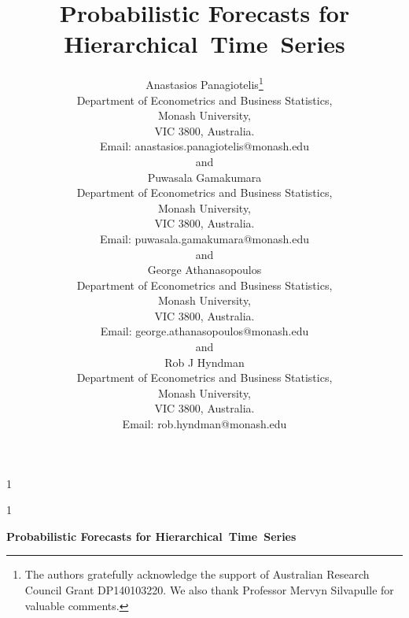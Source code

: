 \documentclass[11pt]{article}
\newcommand{\blind}{1}
\theoremstyle{definition}
\begin{document}
	\def\spacingset#1{\renewcommand{\baselinestretch}%
		{#1}\small\normalsize} \spacingset{1}


	\blind
	{
		\title{\textbf{Probabilistic Forecasts for Hierarchical~Time~Series}}
		        \author{
			    Anastasios Panagiotelis\thanks{
			    	The authors gratefully acknowledge the support of Australian Research Council Grant DP140103220. We also thank Professor Mervyn Silvapulle for valuable comments.}\hspace{.2cm}\\
			    Department of Econometrics and Business Statistics,\\
		    	Monash University,\\ VIC 3800, Australia.\\
			    Email: anastasios.panagiotelis@monash.edu \\
			    and \\
			    Puwasala Gamakumara\\
			    Department of Econometrics and Business Statistics,\\
			    Monash University,\\ VIC 3800, Australia.\\
			    Email: puwasala.gamakumara@monash.edu \\
			    and \\
		        George Athanasopoulos\\
		        Department of Econometrics and Business Statistics,\\
		        Monash University,\\ VIC 3800, Australia.\\
		        Email: george.athanasopoulos@monash.edu \\
		        and \\
	            Rob J Hyndman\\
	            Department of Econometrics and Business Statistics,\\
	            Monash University,\\ VIC 3800, Australia.\\
	            Email: rob.hyndman@monash.edu \\}
		\maketitle
	} \fi

	\blind
	{
		\bigskip
		\bigskip
		\bigskip
		\begin{center}
			{\LARGE\textbf{Probabilistic Forecasts for Hierarchical~Time~Series}}
		\end{center}
		\medskip
	} \fi
\end{document}
